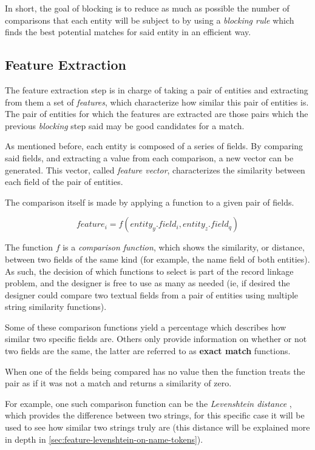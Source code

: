 \documentclass[epsfig,a4paper,11pt,titlepage,twoside,openany]{book}
\begin{document}
In short, the goal of blocking is to reduce as much as possible the number of
comparisons that each entity will be subject to by using a \textit{blocking
  rule} which finds the best potential matches for said entity in an efficient
way.

  
\subsection{Feature Extraction}
\label{sec:rl-workflow-feat-extraction}

The feature extraction step is in charge of taking a pair of entities and
extracting from them a set of \textit{features}, which characterize how similar
this pair of entities is. The pair of entities for which the features are extracted
are those pairs which the previous \textit{blocking} step said may be good
candidates for a match.

As mentioned before, each entity is composed of a series of fields. By comparing said fields, and extracting a value from each comparison, a new vector can be generated. This vector, called \textit{feature vector}, characterizes the similarity between each field of the pair of entities.

The comparison itself is made by applying a function to a given pair of fields. 

$$
feature_i = f(entity_y.field_i , entity_z.field_q)
$$

The function $f$ is a \textit{comparison function}, which shows the
similarity, or distance, between two fields of the same kind (for example, the
name field of both entities). As such, the decision of which functions to select is
part of the record linkage problem, and the designer is free to use as many as needed (ie, if desired the designer could compare two textual fields from a pair of entities
using multiple string similarity functions).

Some of these comparison functions yield a percentage which describes how
similar two specific fields are. Others only provide information on whether or not two fields are the same,
the latter are referred to as \textbf{exact match} functions.

When one of the fields being compared has no value then the function treats the
pair as if it was not a match and returns a similarity of zero.

For example, one such comparison function can be the \textit{Levenshtein distance} \cite{levenshtein1966binary}, which provides the difference between two strings, for this specific case it will be used to see how similar two strings truly are (this distance will be explained more in depth in \autoref{sec:feature-levenshtein-on-name-tokens}). 
\end{document}
